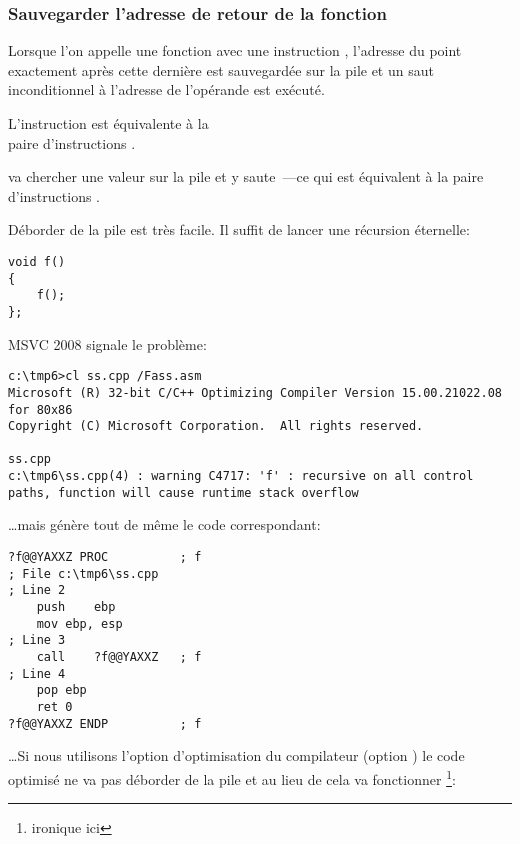 \subsubsection{Sauvegarder l'adresse de retour de la fonction}


Lorsque l'on appelle une fonction avec une instruction \CALL, l'adresse du point
exactement après cette dernière est sauvegardée sur la pile et un saut inconditionnel
à l'adresse de l'opérande \CALL est exécuté.

L'instruction \CALL est équivalente à la\\
paire d'instructions .

\RET va chercher une valeur sur la pile et y saute~---ce qui est équivalent à
la paire d'instructions .

\myindex{\Stack!\MLStackOverflow}
\myindex{\Recursion}
Déborder de la pile est très facile. Il suffit de lancer une récursion éternelle:

\begin{lstlisting}[style=customc]
void f()
{
	f();
};
\end{lstlisting}

MSVC 2008 signale le problème:

\begin{lstlisting}
c:\tmp6>cl ss.cpp /Fass.asm
Microsoft (R) 32-bit C/C++ Optimizing Compiler Version 15.00.21022.08 for 80x86
Copyright (C) Microsoft Corporation.  All rights reserved.

ss.cpp
c:\tmp6\ss.cpp(4) : warning C4717: 'f' : recursive on all control paths, function will cause runtime stack overflow
\end{lstlisting}

\dots mais génère tout de même le code correspondant:

\begin{lstlisting}[style=customasmx86]
?f@@YAXXZ PROC			; f
; File c:\tmp6\ss.cpp
; Line 2
	push	ebp
	mov	ebp, esp
; Line 3
	call	?f@@YAXXZ	; f
; Line 4
	pop	ebp
	ret	0
?f@@YAXXZ ENDP			; f
\end{lstlisting}

\dots Si nous utilisons l'option d'optimisation du compilateur (option \TT{\Ox})
le code optimisé ne va pas déborder de la pile et au lieu de cela va fonctionner
\footnote{ironique ici}:


